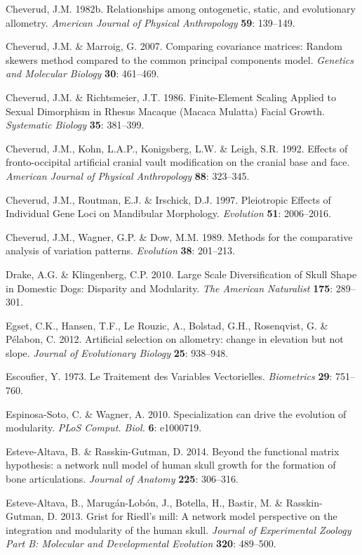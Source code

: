 \documentclass[12pt,twoside]{report}
\begin{document}
Cheverud, J.M. 1982b. Relationships among ontogenetic, static, and
evolutionary allometry. \emph{American Journal of Physical Anthropology}
\textbf{59}: 139--149.

Cheverud, J.M. \& Marroig, G. 2007. Comparing covariance matrices:
Random skewers method compared to the common principal components model.
\emph{Genetics and Molecular Biology} \textbf{30}: 461--469.

Cheverud, J.M. \& Richtsmeier, J.T. 1986. Finite-Element Scaling Applied
to Sexual Dimorphism in Rhesus Macaque (Macaca Mulatta) Facial Growth.
\emph{Systematic Biology} \textbf{35}: 381--399.

Cheverud, J.M., Kohn, L.A.P., Konigsberg, L.W. \& Leigh, S.R. 1992.
Effects of fronto-occipital artificial cranial vault modification on the
cranial base and face. \emph{American Journal of Physical Anthropology}
\textbf{88}: 323--345.

Cheverud, J.M., Routman, E.J. \& Irschick, D.J. 1997. Pleiotropic
Effects of Individual Gene Loci on Mandibular Morphology.
\emph{Evolution} \textbf{51}: 2006--2016.

Cheverud, J.M., Wagner, G.P. \& Dow, M.M. 1989. Methods for the
comparative analysis of variation patterns. \emph{Evolution}
\textbf{38}: 201--213.

Drake, A.G. \& Klingenberg, C.P. 2010. Large Scale Diversification of
Skull Shape in Domestic Dogs: Disparity and Modularity. \emph{The
American Naturalist} \textbf{175}: 289--301.

Egset, C.K., Hansen, T.F., Le Rouzic, A., Bolstad, G.H., Rosenqvist, G.
\& Pélabon, C. 2012. Artificial selection on allometry: change in
elevation but not slope. \emph{Journal of Evolutionary Biology}
\textbf{25}: 938--948.

Escoufier, Y. 1973. Le Traitement des Variables Vectorielles.
\emph{Biometrics} \textbf{29}: 751--760.

Espinosa-Soto, C. \& Wagner, A. 2010. Specialization can drive the
evolution of modularity. \emph{PLoS Comput. Biol.} \textbf{6}: e1000719.

Esteve-Altava, B. \& Rasskin-Gutman, D. 2014. Beyond the functional
matrix hypothesis: a network null model of human skull growth for the
formation of bone articulations. \emph{Journal of Anatomy} \textbf{225}:
306--316.

Esteve-Altava, B., Marugán-Lobón, J., Botella, H., Bastir, M. \&
Rasskin-Gutman, D. 2013. Grist for Riedl's mill: A network model
perspective on the integration and modularity of the human skull.
\emph{Journal of Experimental Zoology Part B: Molecular and
Developmental Evolution} \textbf{320}: 489--500.
\end{document}

